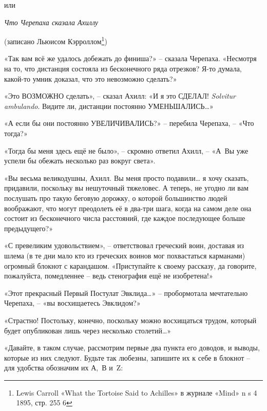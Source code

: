 \documentclass[../main.tex]{subfiles}
\begin{document}

\par\begingroup\centering\Large%
    или

    \emph{Что Черепаха сказала Ахиллу}

    \large%
    (записано Льюисом Кэрроллом\footnote{Lewis Carroll «What the Tortoise Said to Achilles» в журнале «Mind» n s 4 1895, стр. 255 6})
\par\endgroup


«Так вам всё же удалось добежать до финиша?» \--- сказала Черепаха. «Несмотря на то, что дистанция состояла из бесконечного ряда отрезков? Я-то думала, какой-то умник доказал, что это невозможно сделать?»

«Это ВОЗМОЖНО сделать», \--- сказал Ахилл: «И я это СДЕЛАЛ! \emph{Solvitur ambulando}. Видите ли, дистанции постоянно УМЕНЬШАЛИСЬ\ldots»

«А если бы они постоянно УВЕЛИЧИВАЛИСЬ?» \--- перебила Черепаха, \--- «Что тогда?»

«Тогда бы меня здесь ещё не было», \--- скромно ответил Ахилл, \--- «А~Вы уже успели бы обежать несколько раз вокруг света».

«Вы весьма великодушны, Ахилл. Вы меня просто подавили\ldots{} я хочу сказать, придавили, поскольку вы нешуточный тяжеловес. А теперь, не угодно ли вам послушать про такую беговую дорожку, о которой большинство людей воображают, что могут преодолеть её в два-три шага, когда на самом деле она состоит из бесконечного числа расстояний, где каждое последующее больше предыдущего?»

«С превеликим удовольствием», \--- ответствовал греческий воин, доставая из шлема (в те дни мало кто из греческих воинов мог похвастаться карманами) огромный блокнот с карандашом. «Приступайте к своему рассказу, да говорите, пожалуйста, помедленнее \--- ведь стенография ещё не изобретена!»

«Этот прекрасный Первый Постулат Эвклида\ldots» \--- пробормотала мечтательно Черепаха, \--- «вы восхищаетесь Эвклидом?»

«Страстно! Постольку, конечно, поскольку можно восхищаться трудом, который будет опубликован лишь через несколько столетий\ldots»

«Давайте, в таком случае, рассмотрим первые два пункта его доводов, и выводы, которые из них следуют. Будьте так любезны, запишите их к себе в блокнот \--- для удобства обозначим их А,~В и~Z:
\end{document}
